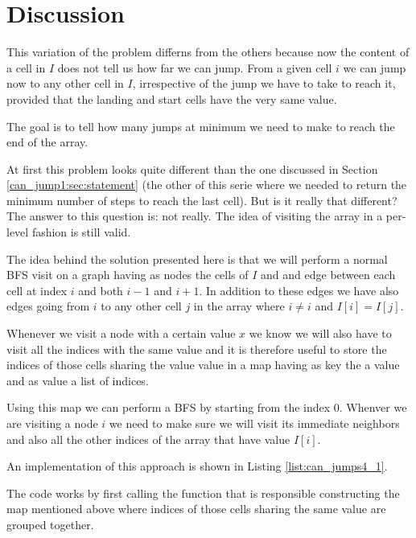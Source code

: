 \section{Discussion}
\label{can_jump4:sec:statement}
This variation of the problem differns from the others because now the content of a cell in $I$ does not tell us how far we can jump. From a given cell $i$ we can jump now to any other cell in $I$, irrespective of the jump we have to take to reach it, provided that the landing and start cells have the very same value.

The goal is to tell how many jumps at minimum we need to make to reach the end of the array.

At first this problem looks quite different than the one discussed in Section \ref{can_jump1:sec:statement} (the other of this serie where we needed to return the minimum number of steps to reach the last cell). But is it really that different? The answer to this question is: not really. The idea of visiting the array in a per-level fashion is still valid.

The idea behind the solution presented here is that we will perform a normal BFS visit on a graph having as nodes the cells of $I$ and and edge between each cell at index $i$ and both $i-1$ and $i+1$. In addition to these edges we have also edges going from $i$ to any other cell $j$ in the array where $i \neq i$ and $I[i] = I[j]$.

Whenever we visit a node with a certain value $x$ we know we will also have to visit all the indices with the same value and it is therefore useful to store the indices of those cells sharing the value value in a map having as key the a value and as value a list of indices.

Using this map we can perform a BFS by starting from the index $0$. Whenver we are visiting a node $i$ we need to make sure we will visit its immediate neighbors and also all the other indices of the array that have value $I[i]$. 

An implementation of this approach is shown in Listing \ref{list:can_jumps4_1}.




The code works by first calling the function  that is responsible constructing the map mentioned above where indices of those cells sharing the same value are grouped together.

